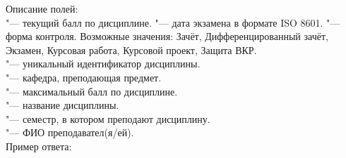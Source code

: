 Описание полей:\\
 "--- текущий балл по дисциплине.
 "--- дата экзамена в формате  ISO 8601.
 "--- форма контроля.
Возможные значения: Зачёт, Дифференцированный зачёт, Экзамен, Курсовая работа, Курсовой проект, Защита ВКР.\\
 "--- уникальный идентификатор дисциплины.\\
 "--- кафедра, преподающая предмет.\\
 "--- максимальный балл по дисциплине.\\
 "--- название дисциплины.\\
 "--- семестр, в котором преподают дисциплину.\\
 "--- ФИО преподавател(я/ей).\\

Пример ответа:
\begin{listing}[H]
\end{listing}
\vspace{-0.75cm}
